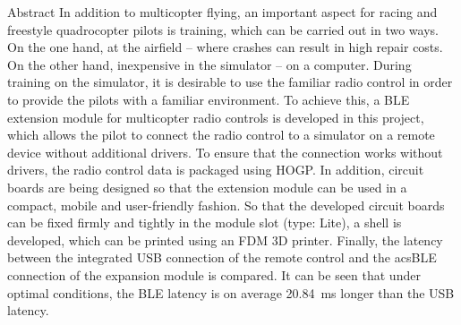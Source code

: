 \begin{abstractpage}
    \begin{abstractsection}{Abstract}
      In addition to multicopter flying, an important aspect for racing and freestyle quadrocopter pilots is training, which can be carried out in two ways. On the one hand, at the airfield -- where crashes can result in high repair costs. On the other hand, inexpensive in the simulator -- on a computer. During training on the simulator, it is desirable to use the familiar radio control in order to provide the pilots with a familiar environment. To achieve this, a \acs{BLE} extension module for multicopter radio controls is developed in this project, which allows the pilot to connect the radio control to a simulator on a remote device without additional drivers. To ensure that the connection works without drivers, the radio control data is packaged using \acs{HOGP}. In addition, circuit boards are being designed so that the extension module can be used in a compact, mobile and user-friendly fashion. So that the developed circuit boards can be fixed firmly and tightly in the module slot (type: Lite), a shell is developed, which can be printed using an \acs{FDM} 3D printer. Finally, the latency between the integrated USB connection of the remote control and the acs{BLE} connection of the expansion module is compared. It can be seen that under optimal conditions, the \acs{BLE} latency is on average 20.84~ms longer than the USB latency. 
    \end{abstractsection}
\end{abstractpage}
